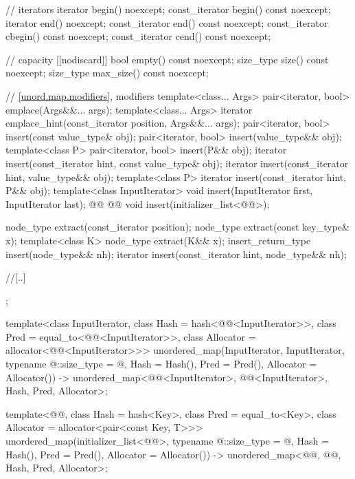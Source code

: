 \documentclass{wg21}
\begin{document}
\begin{codeblock}
{{        // iterators
        iterator       begin() noexcept;
        const_iterator begin() const noexcept;
        iterator       end() noexcept;
        const_iterator end() const noexcept;
        const_iterator cbegin() const noexcept;
        const_iterator cend() const noexcept;
        
        // capacity
        [[nodiscard]] bool empty() const noexcept;
        size_type size() const noexcept;
        size_type max_size() const noexcept;
        
        // \ref{unord.map.modifiers}, modifiers
        template<class... Args> pair<iterator, bool> emplace(Args&&... args);
        template<class... Args> iterator emplace_hint(const_iterator position, Args&&... args);
        pair<iterator, bool> insert(const value_type& obj);
        pair<iterator, bool> insert(value_type&& obj);
        template<class P> pair<iterator, bool> insert(P&& obj);
        iterator       insert(const_iterator hint, const value_type& obj);
        iterator       insert(const_iterator hint, value_type&& obj);
        template<class P> iterator insert(const_iterator hint, P&& obj);
        template<class InputIterator> void insert(InputIterator first, InputIterator last);
        @@
        @@
        void insert(initializer_list<@@>);
        
        node_type extract(const_iterator position);
        node_type extract(const key_type& x);
        template<class K> node_type extract(K&& x);
        insert_return_type insert(node_type&& nh);
        iterator           insert(const_iterator hint, node_type&& nh);
        
        //[..]
    };
    
template<class InputIterator,
class Hash = hash<@@<InputIterator>>,
class Pred = equal_to<@@<InputIterator>>,
class Allocator = allocator<@@<InputIterator>>>
unordered_map(InputIterator, InputIterator, typename @\seebelow@::size_type = @\seebelow@,
Hash = Hash(), Pred = Pred(), Allocator = Allocator())
-> unordered_map<@@<InputIterator>, @@<InputIterator>, Hash, Pred,
Allocator>;

template<@@, class Hash = hash<Key>,
class Pred = equal_to<Key>, class Allocator = allocator<pair<const Key, T>>>
unordered_map(initializer_list<@@>,
typename @\seebelow@::size_type = @\seebelow@, Hash = Hash(),
Pred = Pred(), Allocator = Allocator())
-> unordered_map<@@, @@, Hash, Pred, Allocator>;

}
\end{codeblock}
\end{document}
